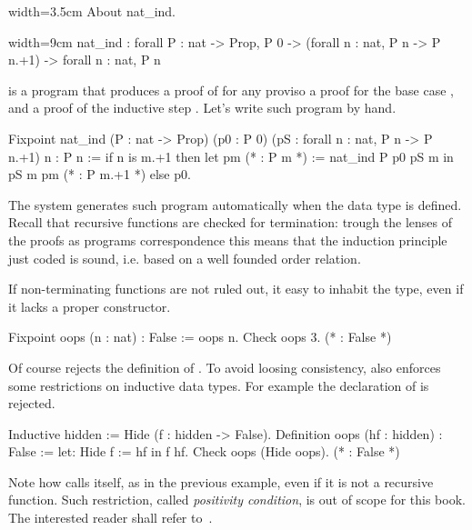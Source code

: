 \begin{coq}{}{width=3.5cm}
About nat_ind.
\end{coq}
\begin{coqout}{}{width=9cm}
nat_ind : forall P : nat -> Prop,
  P 0 -> (forall n : nat, P n -> P n.+1) -> forall n : nat, P n
\end{coqout}
 is a program that produces a proof of  for any 
proviso a proof for the base case , and a proof
of the inductive step .
Let's write such program by hand.

\begin{coq}{}{}
Fixpoint nat_ind (P : nat -> Prop)
  (p0 : P 0) (pS : forall n : nat, P n -> P n.+1) n : P n :=
  if n is m.+1 then
    let pm (* : P m *) := nat_ind P p0 pS m in
    pS m pm (* : P m.+1 *)
  else p0.
\end{coq}

The \Coq{} system generates such program automatically
when the  data type
is defined.  Recall that recursive functions are checked for termination:
trough the lenses of the proofs as programs correspondence this means
that the induction principle just coded is sound, i.e. based on a well
founded order relation.

If non-terminating functions are not ruled out, it easy to inhabit
the  type, even if it lacks a proper constructor.

\begin{coq}{}{}
Fixpoint oops (n : nat) : False := oops n.
Check oops 3.  (* : False *)
\end{coq}
Of course \Coq{} rejects the definition of .  To avoid
loosing consistency, \Coq{} also enforces some restrictions on
inductive data types.  For example the declaration of 
is rejected.

\begin{coq}{}{}
Inductive hidden := Hide (f : hidden -> False).
Definition oops (hf : hidden) : False := let: Hide f := hf in f hf.
Check oops (Hide oops).  (* : False *)
\end{coq}
Note how  calls itself, as in the previous example,
even if it is not a recursive function.
Such restriction, called
\emph{positivity condition}, is out of scope for this book.
The interested reader shall
refer to~\cite{Coq:manual}.

\label{sec:strongind}


